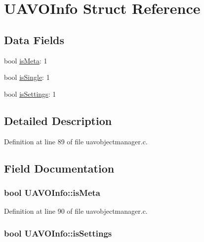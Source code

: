 \hypertarget{struct_u_a_v_o_info}{\section{\-U\-A\-V\-O\-Info \-Struct \-Reference}
\label{struct_u_a_v_o_info}
}
\subsection*{\-Data \-Fields}
\begin{DoxyCompactItemize}
\item 
bool \hyperlink{struct_u_a_v_o_info_a6d180f678afa491a14a13dccf7a6916d}{is\-Meta}\-: 1
\item 
bool \hyperlink{struct_u_a_v_o_info_ac17e3b9e0eaf982bbbba5545026f7bb4}{is\-Single}\-: 1
\item 
bool \hyperlink{struct_u_a_v_o_info_a18d192ef3b73129422653ea96a697711}{is\-Settings}\-: 1
\end{DoxyCompactItemize}


\subsection{\-Detailed \-Description}


\-Definition at line 89 of file uavobjectmanager.\-c.



\subsection{\-Field \-Documentation}
\hypertarget{struct_u_a_v_o_info_a6d180f678afa491a14a13dccf7a6916d}{
\subsubsection[{is\-Meta}]{\setlength{\rightskip}{0pt plus 5cm}bool {\bf \-U\-A\-V\-O\-Info\-::is\-Meta}}}\label{struct_u_a_v_o_info_a6d180f678afa491a14a13dccf7a6916d}


\-Definition at line 90 of file uavobjectmanager.\-c.

\hypertarget{struct_u_a_v_o_info_a18d192ef3b73129422653ea96a697711}{
\subsubsection[{is\-Settings}]{\setlength{\rightskip}{0pt plus 5cm}bool {\bf \-U\-A\-V\-O\-Info\-::is\-Settings}}}\label{struct_u_a_v_o_info_a18d192ef3b73129422653ea96a697711}


